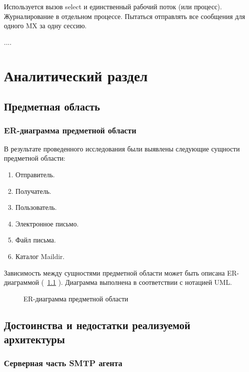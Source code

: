 \documentclass[a4paper,12pt]{report}
\begin{document}
Используется вызов select и единственный рабочий поток (или процесс). Журналирование в отдельном процессе. Пытаться отправлять все сообщения для одного MX за одну сессию.

.... %

\chapter{Аналитический раздел}

\section*{Предметная область}

\subsection*{ER-диаграмма предметной области}

В результате проведенного исследования были выявлены следующие сущности предметной области:

\begin{enumerate}
    \item Отправитель.
    \item Получатель.
    \item Пользователь.
    \item Электронное письмо.
    \item Файл письма.
    \item Каталог Maildir.
\end{enumerate}

Зависимость между сущностями предметной области может быть описана ER-диаграммой (~\ref{fig:er_diagram} ). Диаграмма выполнена в соответствии с нотацией UML.
\begin{figure}
    \centering
    \caption{ER-диаграмма предметной области}
    \label{fig:er_diagram}
\end{figure}


\section*{Достоинства и недостатки реализуемой архитектуры}

\subsection*{Серверная часть SMTP агента}
\end{document}
